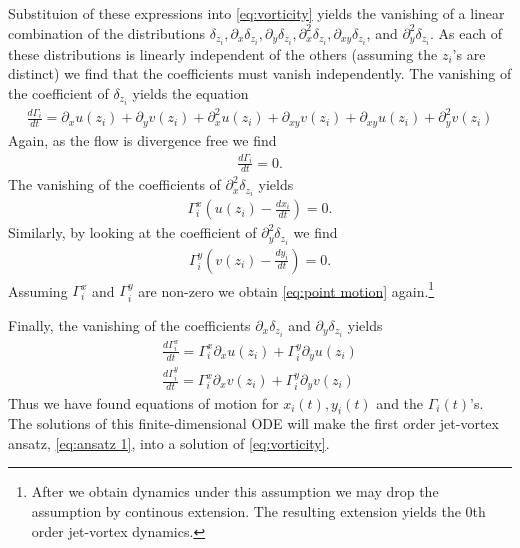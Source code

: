 \documentclass[12pt]{amsart}
\theoremstyle{remark}
\begin{document}
Substituion of these expressions into \eqref{eq:vorticity} yields
the vanishing of
a linear combination of the distributions
$\delta_{z_i},\partial_x\delta_{z_i},\partial_y \delta_{z_i}, \partial_x^2 \delta_{z_i},
 \partial_{xy} \delta_{z_i}$, and $\partial_y^2 \delta_{z_i}$.
As each of these distributions is linearly independent
of the others (assuming the $z_i$'s are distinct)
we find that the coefficients must vanish independently.
The vanishing of the coefficient of $\delta_{z_i}$ yields
the equation
\begin{align*}
  \frac{d\Gamma_i}{dt} = \partial_x u(z_i) + \partial_y v(z_i)
  + \partial_x^2 u(z_i) + \partial_{xy} v(z_i)
  + \partial_{xy} u(z_i) + \partial_y^2 v(z_i)
\end{align*}
Again, as the flow is divergence free we find
\begin{align*}
  \frac{d\Gamma_i}{dt} = 0.
\end{align*}
The vanishing of the coefficients of $\partial_x^2 \delta_{z_i}$ yields
\begin{align*}
  \Gamma_i^x ( u(z_i) - \frac{dx_i}{dt} ) = 0.
\end{align*}
Similarly, by looking at the coefficient of $\partial_y^2 \delta_{z_i}$
we find
\begin{align*}
  \Gamma_i^y ( v(z_i) - \frac{dy_i}{dt} ) = 0.
\end{align*}
Assuming $\Gamma_i^x$ and $\Gamma_i^y$ are non-zero we
obtain \eqref{eq:point motion} again.\footnote{
  After we obtain dynamics under this assumption
  we may drop the assumption by continous extension.
  The resulting extension yields the $0$th order
  jet-vortex dynamics.
}

Finally, the vanishing of the coefficients $\partial_x \delta_{z_i}$ and $\partial_y \delta_{z_i}$ yields
\begin{align*}
  \frac{d\Gamma^x_i}{dt} = \Gamma_i^x \partial_x u(z_i) + \Gamma_i^y \partial_y u(z_i) \\
  \frac{d\Gamma^y_i}{dt} = \Gamma_i^x \partial_x v(z_i) + \Gamma_i^y \partial_y v(z_i)
\end{align*}
Thus we have found equations of motion for $x_i(t),y_i(t)$ and the
$\Gamma_i(t)$'s.
The solutions of this finite-dimensional ODE
will make the first order jet-vortex ansatz, \eqref{eq:ansatz 1},
into a solution of \eqref{eq:vorticity}.
\end{document}
